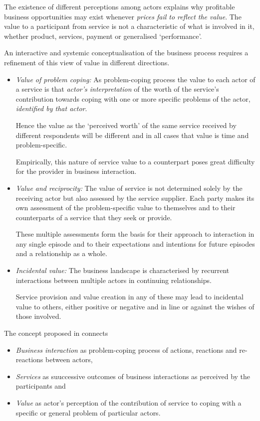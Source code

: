 \documentclass[11pt,a4paper]{article}
\begin{document}
The existence of different perceptions among actors explains why proﬁtable
business opportunities may exist whenever \emph{prices fail to reﬂect the
  value}.  The value to a participant from service is not a characteristic of
what is involved in it, whether product, services, payment or generalised
‘performance’.

An interactive and systemic conceptualisation of the business process requires
a refinement of this view of value in different directions.
\begin{itemize}
\item \emph{Value of problem coping:} As problem-coping process the value to
  each actor of a service is that \emph{actor's interpretation} of the worth
  of the service's contribution towards coping with one or more speciﬁc
  problems of the actor, \emph{identiﬁed by that actor}.

  Hence the value as the ‘perceived worth’ of the same service received by
  different respondents will be different and in all cases that value is time
  and problem-speciﬁc.

  Empirically, this nature of service value to a counterpart poses great
  difficulty for the provider in business interaction.

\item \emph{Value and reciprocity:} The value of service is not determined
  solely by the receiving actor but also assessed by the service supplier.
  Each party makes its own assessment of the problem-speciﬁc value to
  themselves and to their counterparts of a service that they seek or provide.

  These multiple assessments form the basis for their approach to interaction
  in any single episode and to their expectations and intentions for future
  episodes and a relationship as a whole.

\item \emph{Incidental value:} The business landscape is characterised by
  recurrent interactions between multiple actors in continuing relationships.

  Service provision and value creation in any of these may lead to incidental
  value to others, either positive or negative and in line or against the
  wishes of those involved.
\end{itemize}

The concept proposed in \cite{FordMouzas2013} connects
\begin{itemize}
\item \emph{Business interaction} as problem-coping process of actions,
  reactions and re-reactions between actors,
\item \emph{Services} as suuccessive outcomes of business interactions as
  perceived by the participants and
\item \emph{Value} as actor's perception of the contribution of service to
  coping with a specific or general problem of particular actors.
\end{itemize}
\end{document}

